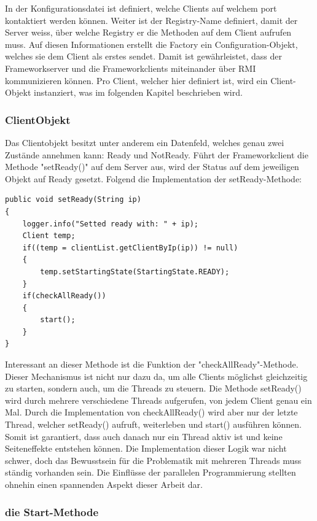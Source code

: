 In der Konfigurationsdatei ist definiert, welche Clients auf welchem port kontaktiert werden können. Weiter ist der Registry-Name definiert, damit der Server weiss, über welche Registry er die Methoden auf dem Client aufrufen muss. \newline
Auf diesen Informationen erstellt die Factory ein Configuration-Objekt, welches sie dem Client als erstes sendet. Damit ist gewährleistet, dass der Frameworkserver und die Frameworkclients miteinander über RMI kommunizieren können. \newline
Pro Client, welcher hier definiert ist, wird ein Client-Objekt instanziert, was im folgenden Kapitel beschrieben wird.

\subsubsection{ClientObjekt}
\label{sec:ClientObjekt}

Das Clientobjekt besitzt unter anderem ein Datenfeld, welches genau zwei Zustände annehmen kann: Ready und NotReady. Führt der Frameworkclient die Methode "setReady()" auf dem Server aus, wird der Status auf dem jeweiligen Objekt auf Ready gesetzt. Folgend die Implementation der setReady-Methode:
\begin{lstlisting}
public void setReady(String ip) 
{
	logger.info("Setted ready with: " + ip);
	Client temp;
	if((temp = clientList.getClientByIp(ip)) != null)
	{
		temp.setStartingState(StartingState.READY);
	}
	if(checkAllReady())
	{
		start();
	}
}
\end{lstlisting}

Interessant an dieser Methode ist die Funktion der "checkAllReady"-Methode. Dieser Mechanismus ist nicht nur dazu da, um alle Clients möglichst gleichzeitig zu starten, sondern auch, um die Threads zu steuern. Die Methode setReady() wird durch mehrere verschiedene Threads aufgerufen, von jedem Client genau ein Mal. Durch die Implementation von checkAllReady() wird aber nur der letzte Thread, welcher setReady() aufruft, weiterleben und start() ausführen können. Somit ist garantiert, dass auch danach nur ein Thread aktiv ist und keine Seiteneffekte entstehen können.\newline
Die Implementation dieser Logik war nicht schwer, doch das Bewusstsein für die Problematik mit mehreren Threads muss ständig vorhanden sein. Die Einflüsse der parallelen Programmierung stellten ohnehin einen spannenden Aspekt dieser Arbeit dar. 

\subsubsection{die Start-Methode}
\label{sec:startMethode}

